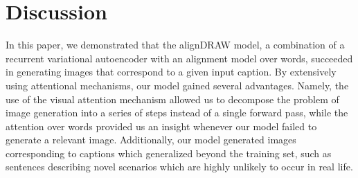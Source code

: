 \documentclass{article} %
\begin{document}

\section{Discussion}

In this paper, we demonstrated that the alignDRAW model, a combination of a recurrent variational autoencoder with an alignment model over words, succeeded in generating images that correspond to a given input caption. By extensively using attentional mechanisms, our model gained several advantages. Namely, the use of the visual attention mechanism allowed us to decompose the problem of image generation into a series of steps instead of a single forward pass, while the attention over words provided us an insight whenever our model failed to generate a relevant image. Additionally, our model generated images corresponding to captions which generalized beyond the training set, such as sentences describing novel scenarios which are highly unlikely to occur in real life.
\end{document}
